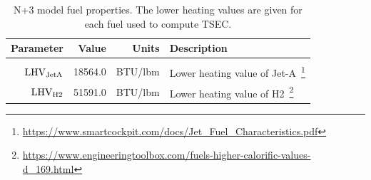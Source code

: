 \documentclass[conf]{new-aiaa}
\begin{document}
\begin{table}[hbt!]
    \centering
    \caption{
        N+3 model fuel properties.
        The lower heating values are given for each fuel used to compute TSEC.}
    \begin{tabular}{r r r l}
        \hline
        Parameter              & Value   & Units        & Description                                                                                                            \\
        \hline                                                                                                                                                                   \\
        $\rm{LHV}_{\rm{JetA}}$ & 18564.0 & \si{BTU/lbm} & Lower heating value of Jet-A~\footnote{\url{https://www.smartcockpit.com/docs/Jet_Fuel_Characteristics.pdf}}           \\
        $\rm{LHV}_{\rm{H2}}$   & 51591.0 & \si{BTU/lbm} & Lower heating value of H2~\footnote{\url{https://www.engineeringtoolbox.com/fuels-higher-calorific-values-d_169.html}} \\
        \hline
    \end{tabular}
    \label{fuel_props}
\end{table}
\end{document}
